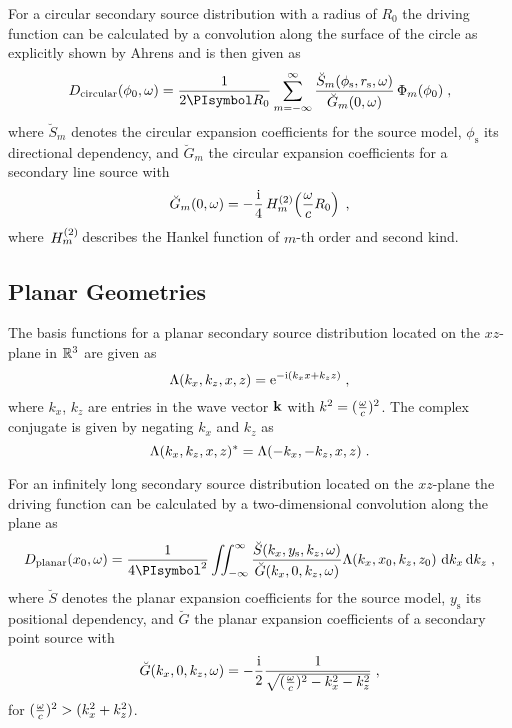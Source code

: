 For a circular secondary source distribution with a radius of $R_0$ the
driving function can
be calculated by a convolution along the surface of the circle as explicitly
shown by Ahrens\autocite{Ahrens2009c} and is then given as
%
\begin{equation}
    D_\text{circular}(\phi_0,\omega) = \frac{1}{2\PI R_0} \sum_{m=-\infty}^\infty 
    \frac{\breve{S}_m(\phi_\text{s},r_\text{s},\omega)}{\breve{G}_m(0,\omega)} \,
    \Phi_m(\phi_0) \qc
    \label{eq:D_circular}
\end{equation}
%
where $\breve{S}_m$ denotes the circular expansion coefficients for
the source model, $\phi_\text{s}$ its directional dependency, and $\breve{G}_m$
the circular expansion coefficients for a secondary line source with
%
\begin{equation}
    \breve{G}_m(0,\omega) = -\frac{\I}{4} \H{m}{2}\left(\omegac R_0\right) \qc
    \label{eq:G_circular}
\end{equation}
%
where $\,H_{m}^{(2)}\!$ describes the Hankel function of $m$-th order and second kind.


\subsection{Planar Geometries}
\label{sec:planar_geometries}

The basis functions for a planar secondary source distribution
located on the $xz$-plane in $\mathbb{R}^3$ are given as
%
\begin{equation}
    \Lambda(k_x,k_z,x,z) = \E^{-\I(k_x x + k_z z)} \qc
    \label{eq:planar_harmonics}
\end{equation}
%
where $k_x$, $k_z$ are entries in the wave vector $\mathbf{k}$ with $k^2 =
(\frac{\omega}{c})^2$.
The complex conjugate is given by negating $k_x$ and $k_z$ as
%
\begin{equation}
    \Lambda(k_x,k_z,x,z)^* = \Lambda(-k_x,-k_z,x,z) \;.
\end{equation}
%

For an infinitely long secondary source distribution located on the
$xz$-plane the driving function can be calculated by a two-dimensional
convolution along the plane as\autocite[][(3.65)]{Ahrens2012}
%
\begin{equation}
    D_\text{planar}(x_0,\omega) = \frac{1}{4\PI^2} \iint_{-\infty}^\infty
    \frac{\breve{S}(k_x,y_\text{s},k_z,\omega)}{\breve{G}(k_x,0,k_z,\omega)}
    \Lambda(k_x,x_0,k_z,z_0) \, \D{k_x} \D{k_z} \qc
    \label{eq:D_planar}
\end{equation}
%
where $\breve{S}$ denotes the planar expansion coefficients for the
source model, $y_\text{s}$ its positional dependency, and $\breve{G}$ the planar
expansion coefficients of a secondary point source with\autocite[][(65)]{Schultz2014}
%
\begin{equation}
    \breve{G}(k_x,0,k_z,\omega) = -\frac{\I}{2}
    \frac{1}{\sqrt{(\omegac)^2-k_x^2-k_z^2}}
    \qc
    \label{G_planar}
\end{equation}
%
for $(\frac{\omega}{c})^2 > (k_x^2+k_z^2)$.

